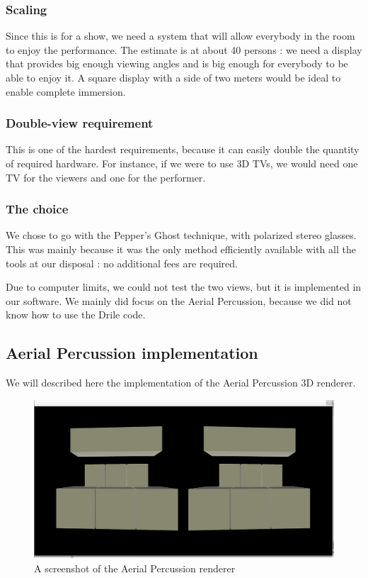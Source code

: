 \subsubsection{Scaling}
Since this is for a show, we need a system that will allow everybody in the room to enjoy the performance. The estimate is at about 40 persons : we need a display that provides big enough viewing angles and is big enough for everybody to be able to enjoy it. A square display with a side of two meters would be ideal to enable complete immersion.
\subsubsection{Double-view requirement}
This is one of the hardest requirements, because it can easily double the quantity of required hardware. For instance, if we were to use 3D TVs, we would need one TV for the viewers and one for the performer.

\subsubsection{The choice}
We chose to go with the Pepper's Ghost technique, with polarized stereo glasses. This was mainly because it was the only method efficiently available with all the tools at our disposal : no additional fees are required.

Due to computer limits, we could not test the two views, but it is implemented in our software. We mainly did focus on the Aerial Percussion, because we did not know how to use the Drile code. 

\subsection{Aerial Percussion implementation}
We will described here the implementation of the Aerial Percussion 3D renderer.

\begin{figure}[h!]
\centering
\includegraphics[scale=0.3]{image/percuScreen.png}
\caption{A screenshot of the Aerial Percussion renderer}
\label{fig:percScreen}
\end{figure}


